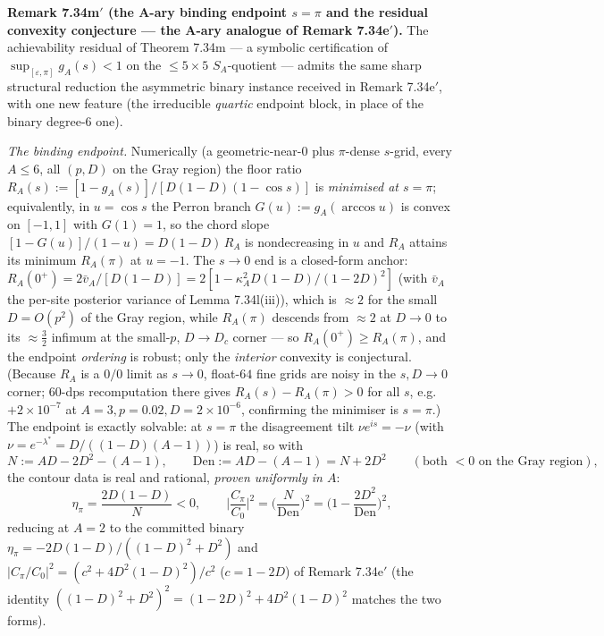 \documentclass[
]{article}
\begin{document}
\textbf{Remark 7.34m$'$ (the A-ary binding endpoint $s=\pi$ and the residual
convexity conjecture --- the A-ary analogue of Remark 7.34e$'$).} The
achievability residual of Theorem 7.34m --- a symbolic certification of
$\sup_{[\varepsilon,\pi]}g_A(s)<1$ on the $\le5\times5$ $S_A$-quotient ---
admits the same sharp structural reduction the asymmetric binary instance
received in Remark 7.34e$'$, with one new feature (the irreducible \emph{quartic}
endpoint block, in place of the binary degree-$6$ one).

\emph{The binding endpoint.} Numerically (a geometric-near-$0$ plus $\pi$-dense
$s$-grid, every $A\le6$, all $(p,D)$ on the Gray region) the floor ratio
$R_A(s):=[1-g_A(s)]/[D(1-D)(1-\cos s)]$ is \emph{minimised at $s=\pi$};
equivalently, in $u=\cos s$ the Perron branch $G(u):=g_A(\arccos u)$ is convex
on $[-1,1]$ with $G(1)=1$, so the chord slope $[1-G(u)]/(1-u)=D(1-D)\,R_A$ is
nondecreasing in $u$ and $R_A$ attains its minimum $R_A(\pi)$ at $u=-1$. The
$s\to0$ end is a closed-form anchor: $R_A(0^+)=2\bar v_A/[D(1-D)]=2[1-\kappa_A^2
D(1-D)/(1-2D)^2]$ (with $\bar v_A$ the per-site posterior variance of
Lemma 7.34l(iii)), which is $\approx2$ for the small $D=O(p^2)$ of the Gray
region, while $R_A(\pi)$ descends from $\approx2$ at $D\to0$ to its $\approx\tfrac32$
infimum at the small-$p$, $D\to D_c$ corner --- so $R_A(0^+)\ge R_A(\pi)$, and the
endpoint \emph{ordering} is robust; only the \emph{interior} convexity is
conjectural. (Because $R_A$ is a $0/0$ limit as $s\to0$, float-$64$ fine grids
are noisy in the $s,D\to0$ corner; $60$-dps recomputation there gives
$R_A(s)-R_A(\pi)>0$ for all $s$, e.g.\ $+2\times10^{-7}$ at $A{=}3,p{=}0.02,
D{=}2\times10^{-6}$, confirming the minimiser is $s=\pi$.) The endpoint is exactly solvable: at $s=\pi$ the disagreement tilt $\nu e^{is}=-\nu$ (with
$\nu=e^{-\lambda^*}=D/((1-D)(A-1))$) is real, so with
\[
  N:=AD-2D^2-(A-1),\qquad \mathrm{Den}:=AD-(A-1)=N+2D^2
  \qquad(\text{both }<0\text{ on the Gray region}),
\]
the contour data is real and rational, \emph{proven uniformly in $A$}:
\[
  \eta_\pi=\frac{2D(1-D)}{N}<0,\qquad
  \Big|\frac{C_\pi}{C_0}\Big|^2=\Big(\frac{N}{\mathrm{Den}}\Big)^2
  =\Big(1-\frac{2D^2}{\mathrm{Den}}\Big)^2,
\]
reducing at $A=2$ to the committed binary $\eta_\pi=-2D(1-D)/((1-D)^2+D^2)$ and
$|C_\pi/C_0|^2=(c^2+4D^2(1-D)^2)/c^2$ ($c=1-2D$) of Remark 7.34e$'$ (the
identity $((1-D)^2+D^2)^2=(1-2D)^2+4D^2(1-D)^2$ matches the two forms).
\end{document}
